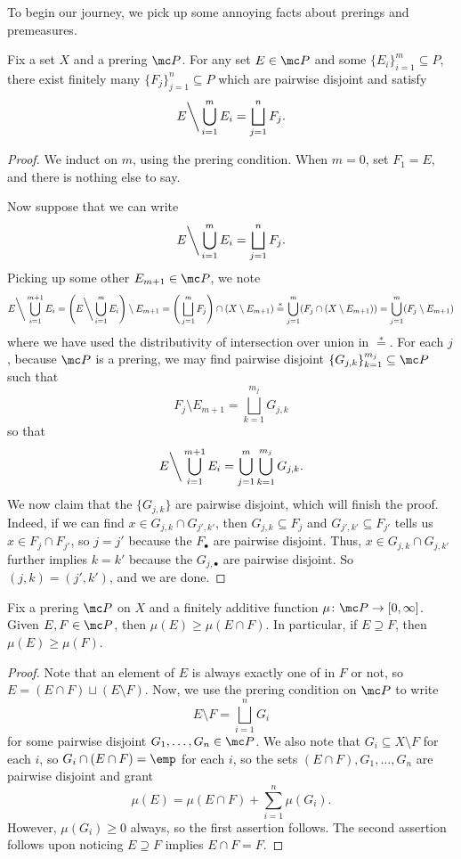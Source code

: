 \documentclass[../notes.tex]{subfiles}
\begin{document}
To begin our journey, we pick up some annoying facts about prerings and premeasures.
\begin{lemma} \label{lem:inductive-prering-subtract}
	Fix a set $X$ and a prering $\mc P$. For any set $E\in\mc P$ and some $\{E_i\}_{i=1}^m\subseteq P$, there exist finitely many $\{F_j\}_{j=1}^n\subseteq P$ which are pairwise disjoint and satisfy
	\[E{\mathbin\bigg\backslash}\bigcup_{i=1}^mE_i=\bigsqcup_{j=1}^nF_j.\]
\end{lemma}
\begin{proof}
	We induct on $m$, using the prering condition. When $m=0$, set $F_1=E$, and there is nothing else to say.

	Now suppose that we can write
	\[E{\mathbin\bigg\backslash}\bigcup_{i=1}^mE_i=\bigsqcup_{j=1}^nF_j.\]
	Picking up some other $E_{m+1}\in\mc P$, we note
	\[E{\mathbin\bigg\backslash}\bigcup_{i=1}^{m+1}E_i=\Bigg(E{\mathbin\bigg\backslash}\bigcup_{i=1}^mE_i\Bigg)\setminus E_{m+1}=\Bigg(\bigsqcup_{j=1}^mF_j\Bigg)\cap(X\setminus E_{m+1})\stackrel*=\bigcup_{j=1}^m(F_j\cap(X\setminus E_{m+1}))=\bigcup_{j=1}^m(F_j\setminus E_{m+1})\]
	where we have used the distributivity of intersection over union in $\stackrel*=$. For each $j$, because $\mc P$ is a prering, we may find pairwise disjoint $\{G_{j,k}\}_{k=1}^{m_j}\subseteq\mc P$ such that
	\[F_j\setminus E_{m+1}=\bigsqcup_{k=1}^{m_j}G_{j,k}\]
	so that
	\[E{\mathbin\bigg\backslash}\bigcup_{i=1}^{m+1}E_i=\bigcup_{j=1}^m\bigcup_{k=1}^{m_j}G_{j,k}.\]
	We now claim that the $\{G_{j,k}\}$ are pairwise disjoint, which will finish the proof. Indeed, if we can find $x\in G_{j,k}\cap G_{j',k'}$, then $G_{j,k}\subseteq F_j$ and $G_{j',k'}\subseteq F_{j'}$ tells us $x\in F_j\cap F_{j'}$, so $j=j'$ because the $F_\bullet$ are pairwise disjoint. Thus, $x\in G_{j,k}\cap G_{j,k'}$ further implies $k=k'$ because the $G_{j,\bullet}$ are pairwise disjoint. So $(j,k)=(j',k')$, and we are done.
\end{proof}
\begin{lemma} \label{lem:fin-additive-is-monotone}
	Fix a prering $\mc P$ on $X$ and a finitely additive function $\mu\colon\mc P\to[0,\infty]$. Given $E,F\in\mc P$, then $\mu(E)\ge\mu(E\cap F)$. In particular, if $E\supseteq F$, then $\mu(E)\ge\mu(F)$.
\end{lemma}
\begin{proof}
	Note that an element of $E$ is always exactly one of in $F$ or not, so $E=(E\cap F)\sqcup(E\setminus F)$. Now, we use the prering condition on $\mc P$ to write
	\[E\setminus F=\bigsqcup_{i=1}^nG_i\]
	for some pairwise disjoint $G_1,\ldots,G_n\in\mc P$. We also note that $G_i\subseteq X\setminus F$ for each $i$, so $G_i\cap(E\cap F)=\emp$ for each $i$, so the sets $(E\cap F),G_1,\ldots,G_n$ are pairwise disjoint and grant
	\[\mu(E)=\mu(E\cap F)+\sum_{i=1}^n\mu(G_i).\]
	However, $\mu(G_i)\ge0$ always, so the first assertion follows. The second assertion follows upon noticing $E\supseteq F$ implies $E\cap F=F$.
\end{proof}
\end{document}

